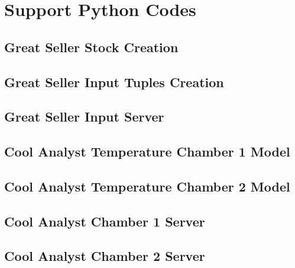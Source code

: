\chapter{Support Python Codes}
\label{sec:Appendix2}

\section{Great Seller Stock Creation}
\label{sec:Appendix2Sec1}



\section{Great Seller Input Tuples Creation}
\label{sec:Appendix2Sec2}



\section{Great Seller Input Server}
\label{sec:Appendix2Sec3}



\section{Cool Analyst Temperature Chamber 1 Model}
\label{sec:Appendix2Sec4}



\section{Cool Analyst Temperature Chamber 2 Model}
\label{sec:Appendix2Sec5}



\section{Cool Analyst Chamber 1 Server}
\label{sec:Appendix2Sec6}



\section{Cool Analyst Chamber 2 Server}
\label{sec:Appendix2Sec7}


